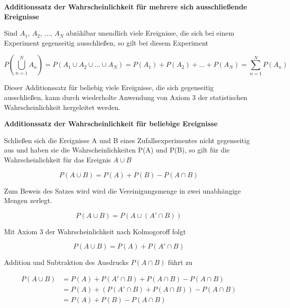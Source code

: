 {\selectfont
\noindent\textbf{Additionssatz der Wahrscheinlichkeit f\"{u}r mehrere sich ausschlie{\ss}ende Ereignisse}} \smallskip

\noindent Sind $A_{1}$, $A_{2}$, ..., $A_{N}$ abz\"{a}hlbar unendlich viele Ereignisse, die sich bei einem Experiment gegenseitig ausschlie{\ss}en, so gilt bei diesem Experiment

\begin{equation}\label{eq:twofourtyeight}
P(\bigcup _{n=1}^{N}A_{n})=P(A_{1} \cup A_{2} \cup ...\cup A_{N} )=P(A_{1})+P(A_{2})+...+P(A_{N})=\sum _{n=1}^{N}P(A_{n})
\end{equation}

\noindent Dieser Additionssatz f\"{u}r beliebig viele Ereignisse, die sich gegenseitig ausschlie{\ss}en, kann durch wiederholte Anwendung von Axiom 3 der statistischen Wahrscheinlichkeit hergeleitet werden. 

{\selectfont
\noindent\textbf{Additionssatz der Wahrscheinlichkeit für beliebige Ereignisse}} \smallskip

\noindent Schlie{\ss}en sich die Ereignisse A und B eines Zufallsexperimentes nicht gegenseitig aus und haben sie die Wahrscheinlichkeiten P(A) und P(B), so gilt für die Wahrscheinlichkeit f\"{u}r das Ereignis $A \cup B$ 

\begin{equation}\label{eq:twofourtynine}
P(A\cup B)=P(A)+P(B)-P(A\cap B)
\end{equation}

\noindent Zum Beweis des Satzes wird wird die Vereinigungsmenge in zwei unabh\"{a}ngige Mengen zerlegt.

\begin{equation}\label{eq:twofifty}
P\left(A\cup B\right)=P\left(A\cup \left(A'\cap B\right)\right)
\end{equation}

\noindent Mit Axiom 3 der Wahrscheinlichkeit nach Kolmogoroff folgt 

\begin{equation}\label{eq:twofiftyone}
P\left(A\cup B\right)=P\left(A\right)+P\left(A'\cap B\right)
\end{equation}

\noindent Addition und Subtraktion des Ausdrucks $P(A\cap B)$ f\"{u}hrt zu

\begin{equation}\label{eq:twofiftytwo}
\begin{split}
P(A\cup B) & = P(A)+P(A'\cap B)+P(A\cap B)-P(A\cap B) \\ 
& = P(A)+(P(A'\cap B)+P(A\cap B))-P(A\cap B)\\ 
& = P(A)+P(B)-P(A\cap B)
\end{split}
\end{equation}

